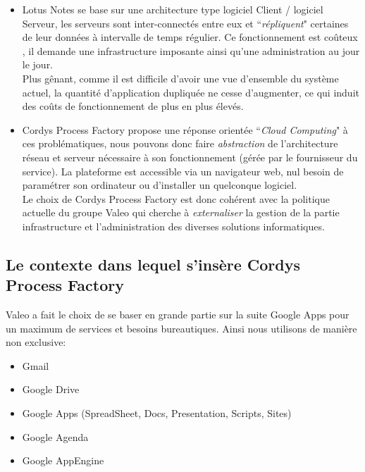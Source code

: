 \begin{itemize}
		\item Lotus Notes se base sur une architecture type logiciel Client / logiciel Serveur, les serveurs sont inter-connectés entre eux et ``\textit{répliquent}" certaines de leur données à intervalle de temps régulier. Ce fonctionnement est coûteux , il demande une infrastructure imposante ainsi qu'une administration au jour le jour. \\
		Plus gênant, comme il est difficile d'avoir une vue d'ensemble du système actuel, la quantité d'application dupliquée ne cesse d'augmenter, ce qui induit des coûts de fonctionnement de plus en plus élevés.\\

	\item Cordys Process Factory propose une réponse orientée ``\textit{Cloud Computing}" à ces problématiques, nous pouvons donc faire \textit{abstraction} de l'architecture réseau et serveur nécessaire à son fonctionnement (gérée par le fournisseur du service). La plateforme est accessible via un navigateur web, nul besoin de paramétrer son ordinateur ou d'installer un quelconque logiciel.\\
	Le choix de Cordys Process Factory est donc cohérent avec la politique actuelle du groupe Valeo qui cherche à \emph{externaliser} la gestion de la partie infrastructure et l'administration des diverses solutions informatiques.\\
	\end{itemize}


\subsection{Le contexte dans lequel s'insère Cordys Process Factory}

Valeo a fait le choix de se baser en grande partie sur la suite Google Apps pour un maximum de services et besoins bureautiques. Ainsi nous utilisons de manière non exclusive: 

	\begin{itemize}
		\item Gmail
		\item Google Drive
		\item Google Apps (SpreadSheet, Docs, Presentation, Scripts, Sites)
		\item Google Agenda 
		\item Google AppEngine
	\end{itemize}

